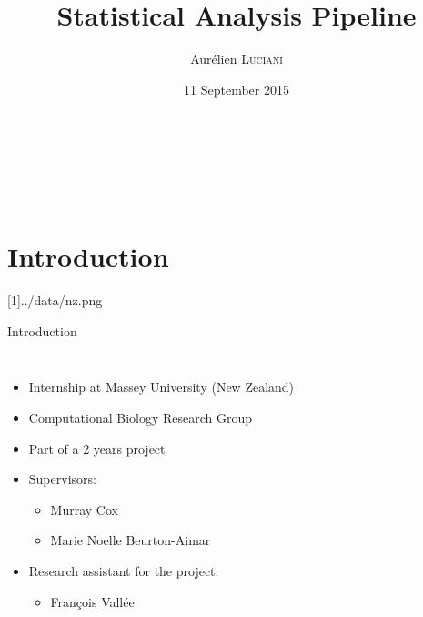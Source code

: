 \documentclass[10pt, aspectratio=43]{beamer}
\title{Statistical Analysis Pipeline}
\author{Aurélien \textsc{Luciani}}
\institute{Université de Bordeaux}
\date{11 September 2015}
\begin{document}



\begin{frame}[t, noframenumbering]  %
\masseyTitlepage

\raggedleft
\begin{mblock}[140pt]{0.7}{}
\raggedleft
\textbf{\insertauthor}\\
\insertdepartment\\
\insertinstitute\\
\insertdate
\end{mblock}
\vfill
\end{frame}


\section*{Introduction}
\masseyBrand{}[1]{../data/nz.png}{}{}
\begin{frame}{}{Introduction}
\vspace*{0.5cm}
\begin{columns}
  
  \color{white}
  \begin{itemize}
    \item Internship at Massey University (New Zealand)
    \item Computational Biology Research Group
    \item Part of a 2 years project
    \item Supervisors:
    \begin{itemize}
      \item Murray Cox
      \item Marie Noelle Beurton-Aimar
    \end{itemize}
    \item Research assistant for the project:
    \begin{itemize}
      \item François Vallée
    \end{itemize}
  \end{itemize}

\end{columns}
\end{frame}
\end{document}
